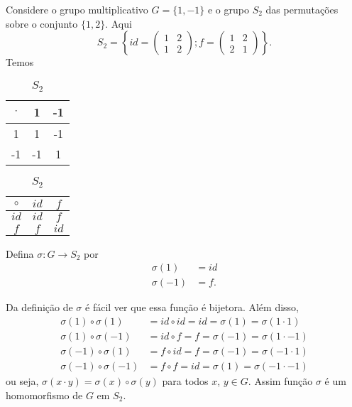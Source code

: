 Considere o grupo multiplicativo $G = \{1, -1\}$ e o grupo $S_2$ das permutações sobre o conjunto $\{1,2\}$. Aqui
\[
    S_2 = \left\{id = \begin{pmatrix}
        1 & 2\\1 & 2
    \end{pmatrix}; f = \begin{pmatrix}
        1 & 2\\2 & 1
    \end{pmatrix}\right\}.
\]
Temos
\begin{table}[!htp]
    \begin{minipage}{.5\linewidth}
        \caption{$G$}
        \centering
        \begin{tabular}{|c|c|c|}
            \hline
            $\cdot$ & 1 & -1\\
            \hline
            1 & 1 & -1\\
            \hline
            -1 & -1 & 1\\
            \hline
        \end{tabular}
    \end{minipage}%
    \begin{minipage}{.5\linewidth}
        \caption{$S_2$}
        \centering
        \begin{tabular}{|c|c|c|}
            \hline
            $\circ$ & $id$ & $f$\\
            \hline
            $id$ & $id$ & $f$\\
            \hline
            $f$ & $f$ & $id$\\
            \hline
        \end{tabular}
    \end{minipage}
\end{table}

Defina $\sigma : G \to S_2$ por
\begin{align*}
    \sigma(1) &= id\\
    \sigma(-1) &= f.
\end{align*}

Da definição de $\sigma$ é fácil ver que essa função é bijetora. Além disso,
\begin{align*}
    \sigma(1) \circ \sigma(1) &= id \circ id = id = \sigma(1) = \sigma(1 \cdot 1)\\
    \sigma(1) \circ \sigma(-1) &= id \circ f = f = \sigma(-1) = \sigma(1 \cdot -1)\\
    \sigma(-1) \circ \sigma(1) &= f \circ id = f = \sigma(-1) = \sigma(-1 \cdot 1)\\
    \sigma(-1) \circ \sigma(-1) &= f \circ f = id = \sigma(1) = \sigma(-1 \cdot -1)
\end{align*}
ou seja, $\sigma(x\cdot y) = \sigma(x) \circ \sigma(y)$ para todos $x$, $y \in G$. Assim função $\sigma$ é um homomorfismo de $G$ em $S_2$.

